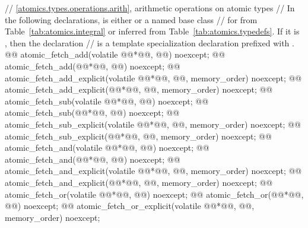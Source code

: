 \begin{codeblock}
{  // \ref{atomics.types.operations.arith}, arithmetic operations on atomic types
  // In the following declarations,  is either  or a named base class
  // for  from Table~\ref{tab:atomics.integral} or inferred from Table~\ref{tab:atomics.typedefs}. If it is , then the declaration
  // is a template specialization declaration prefixed with .
  @@ atomic_fetch_add(volatile @@*@\itcorr[-1]@, @@) noexcept;
  @@ atomic_fetch_add(@@*@\itcorr[-1]@, @@) noexcept;
  @@ atomic_fetch_add_explicit(volatile @@*@\itcorr[-1]@, @@, memory_order) noexcept;
  @@ atomic_fetch_add_explicit(@@*@\itcorr[-1]@, @@, memory_order) noexcept;
  @@ atomic_fetch_sub(volatile @@*@\itcorr[-1]@, @@) noexcept;
  @@ atomic_fetch_sub(@@*@\itcorr[-1]@, @@) noexcept;
  @@ atomic_fetch_sub_explicit(volatile @@*@\itcorr[-1]@, @@, memory_order) noexcept;
  @@ atomic_fetch_sub_explicit(@@*@\itcorr[-1]@, @@, memory_order) noexcept;
  @@ atomic_fetch_and(volatile @@*@\itcorr[-1]@, @@) noexcept;
  @@ atomic_fetch_and(@@*@\itcorr[-1]@, @@) noexcept;
  @@ atomic_fetch_and_explicit(volatile @@*@\itcorr[-1]@, @@, memory_order) noexcept;
  @@ atomic_fetch_and_explicit(@@*@\itcorr[-1]@, @@, memory_order) noexcept;
  @@ atomic_fetch_or(volatile @@*@\itcorr[-1]@, @@) noexcept;
  @@ atomic_fetch_or(@@*@\itcorr[-1]@, @@) noexcept;
  @@ atomic_fetch_or_explicit(volatile @@*@\itcorr[-1]@, @@, memory_order) noexcept;
}
\end{codeblock}
